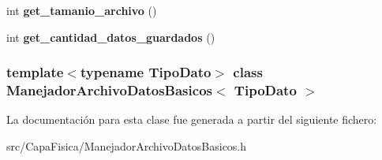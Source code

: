 \begin{DoxyCompactItemize}
\item 
\hypertarget{class_manejador_archivo_datos_basicos_a0931a7a252b606d5f86c6508d6043134}{int {\bfseries get\-\_\-tamanio\-\_\-archivo} ()}\label{class_manejador_archivo_datos_basicos_a0931a7a252b606d5f86c6508d6043134}

\item 
\hypertarget{class_manejador_archivo_datos_basicos_a5622356932d402139601237dcaa679c2}{int {\bfseries get\-\_\-cantidad\-\_\-datos\-\_\-guardados} ()}\label{class_manejador_archivo_datos_basicos_a5622356932d402139601237dcaa679c2}

\end{DoxyCompactItemize}
\subsubsection*{template$<$typename \-Tipo\-Dato$>$ class Manejador\-Archivo\-Datos\-Basicos$<$ Tipo\-Dato $>$}



\-La documentación para esta clase fue generada a partir del siguiente fichero\-:\begin{DoxyCompactItemize}
\item 
src/\-Capa\-Fisica/\-Manejador\-Archivo\-Datos\-Basicos.\-h\end{DoxyCompactItemize}
